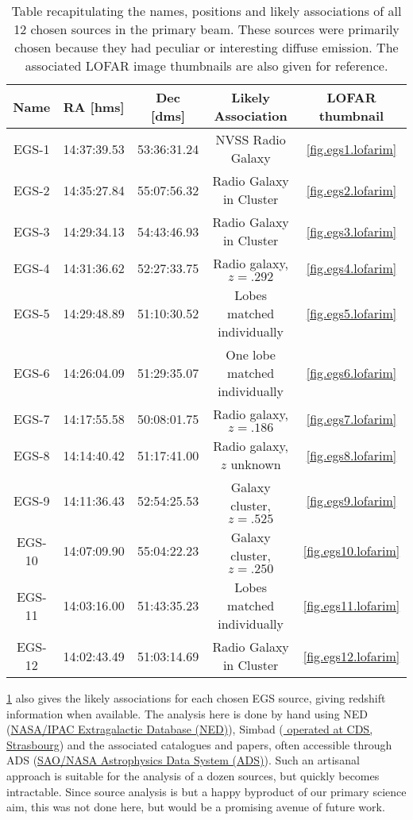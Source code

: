 \begin{table}[h!]
\begin{tabular}{ccccc}
Name    & RA [hms]    & Dec [dms]   & Likely Association            & LOFAR thumbnail \\\hline
EGS-1   & 14:37:39.53 & 53:36:31.24 & NVSS Radio Galaxy             & \cref{fig.egs1.lofarim} \\
EGS-2   & 14:35:27.84 & 55:07:56.32 & Radio Galaxy in Cluster       & \cref{fig.egs2.lofarim} \\ 
EGS-3   & 14:29:34.13 & 54:43:46.93 & Radio Galaxy in Cluster       & \cref{fig.egs3.lofarim} \\
EGS-4   & 14:31:36.62 & 52:27:33.75 & Radio galaxy, $z=.292$        & \cref{fig.egs4.lofarim} \\
EGS-5   & 14:29:48.89 & 51:10:30.52 & Lobes matched individually    & \cref{fig.egs5.lofarim} \\
EGS-6   & 14:26:04.09 & 51:29:35.07 & One lobe matched individually & \cref{fig.egs6.lofarim} \\
EGS-7   & 14:17:55.58 & 50:08:01.75 & Radio galaxy, $z=.186$        & \cref{fig.egs7.lofarim} \\
EGS-8   & 14:14:40.42 & 51:17:41.00 & Radio galaxy, $z$ unknown     & \cref{fig.egs8.lofarim} \\
EGS-9   & 14:11:36.43 & 52:54:25.53 & Galaxy cluster, $z=.525$      & \cref{fig.egs9.lofarim} \\
EGS-10  & 14:07:09.90 & 55:04:22.23 & Galaxy cluster, $z=.250$      & \cref{fig.egs10.lofarim} \\
EGS-11  & 14:03:16.00 & 51:43:35.23 & Lobes matched individually    & \cref{fig.egs11.lofarim} \\
EGS-12  & 14:02:43.49 & 51:03:14.69 & Radio Galaxy in Cluster       & \cref{fig.egs12.lofarim} \\
\end{tabular}
\caption{\label{table.egs.sources} Table recapitulating the names, positions and likely associations of all 12 chosen sources in the primary beam. These sources were primarily chosen because they had peculiar or interesting diffuse emission. The associated LOFAR image thumbnails are also given for reference.}
\end{table}

\pg
\cref{table.egs.sources} also gives the likely associations for each chosen EGS source, giving redshift information when available. The analysis here is done by hand using NED (\href{https://ned.ipac.caltech.edu/}{NASA/IPAC Extragalactic Database (NED)}), Simbad (\href{http://simbad.u-strasbg.fr/simbad/}{
operated at CDS, Strasbourg}) and the associated catalogues and papers, often accessible through ADS (\href{http://adsabs.harvard.edu/}{SAO/NASA Astrophysics Data System (ADS)}). Such an artisanal approach is suitable for the analysis of a dozen sources, but quickly becomes intractable. %
Since source analysis is but a happy byproduct of our primary science aim, this was not done here, but would be a promising avenue of future work.

